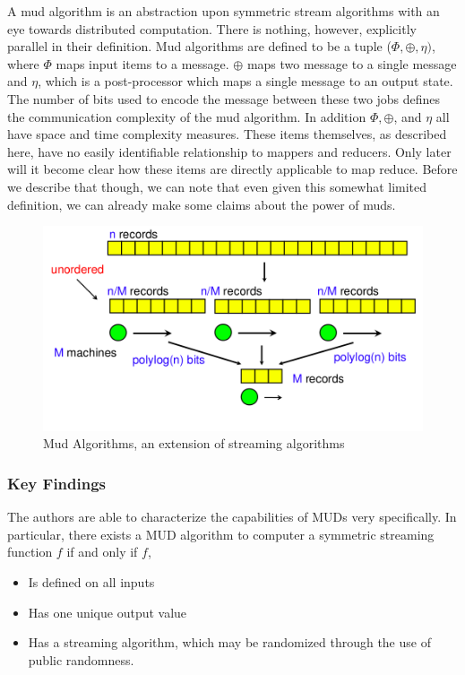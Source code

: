 \documentclass{article}
\begin{document}
A mud algorithm is an abstraction upon symmetric stream algorithms with an eye towards distributed computation. There is nothing, however, explicitly parallel in their definition. Mud algorithms are defined to be a tuple ($\Phi, \oplus, \eta)$, where $\Phi$ maps input items to a message. $\oplus$ maps two message to a single message and $\eta$, which is a post-processor which maps a single message to an output state. The number of bits used to encode the message between these two jobs defines the communication complexity of the mud algorithm. In addition $\Phi, \oplus$, and $\eta$ all have space and time complexity measures. These items themselves, as described here, have no easily identifiable relationship to mappers and reducers. Only later will it become clear how these items are directly applicable to map reduce. Before we describe that though, we can note that even given this somewhat limited definition, we can already make some claims about the power of muds. 

\begin{figure}[h]
\begin{center}
\includegraphics[width=120mm]{mud.png}
\caption{Mud Algorithms, an extension of streaming algorithms\cite{mud2}}
\label{fig:streaming}
\end{center}
\end{figure}

\subsubsection{Key Findings}

The authors are able to characterize the capabilities of MUDs very specifically. In particular, there exists a MUD algorithm to computer a symmetric streaming function $f$ if and only if $f$, 
\begin{itemize}
\item Is defined on all inputs
\item Has one unique output value
\item Has a streaming algorithm, which may be randomized through the use of public randomness. 
\end{itemize}
\end{document}
